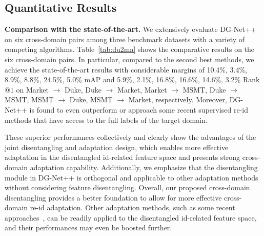 \documentclass[runningheads]{llncs}
\begin{document}
\subsection{Quantitative Results}
\noindent\textbf{Comparison with the state-of-the-art.} We extensively evaluate DG-Net++ on six cross-domain pairs among three benchmark datasets with a variety of competing algorithms. Table~\ref{tab:du2ma} shows the comparative results on the six cross-domain pairs. In particular, compared to the second best methods, we achieve the state-of-the-art results with considerable margins of 10.4\%, 3.4\%, 8.9\%, 8.8\%, 24.5\%, 5.0\% mAP and 5.9\%, 2.1\%, 16.8\%, 16.6\%, 14.6\%, 3.2\% Rank$@1$ on Market $\rightarrow$ Duke, Duke $\rightarrow$ Market, Market $\rightarrow$ MSMT, Duke $\rightarrow$ MSMT, MSMT $\rightarrow$ Duke, MSMT $\rightarrow$ Market, respectively. Moreover, DG-Net++ is found to even outperform or approach some recent supervised re-id methods \cite{huang2018multi,liu2018pose,sun2017svdnet,unlabeld-samples,zheng2018pedestrian} that have access to the full labels of the target domain. 



These superior performances collectively and clearly show the advantages of the joint disentangling and adaptation design, which enables more effective adaptation in the disentangled id-related feature space and presents strong cross-domain adaptation capability. 
Additionally, we emphasize that the disentangling module in DG-Net++ is orthogonal and applicable to other adaptation methods without considering feature disentangling. Overall, our proposed cross-domain disentangling provides a better foundation to allow for more effective cross-domain re-id adaptation. Other adaptation methods, such as some recent approaches~\cite{Fu_2019_ICCV,Ge2020Mutual,zhong2019invariance}, can be readily applied to the disentangled id-related feature space, and their performances may even be boosted further.
\end{document}
